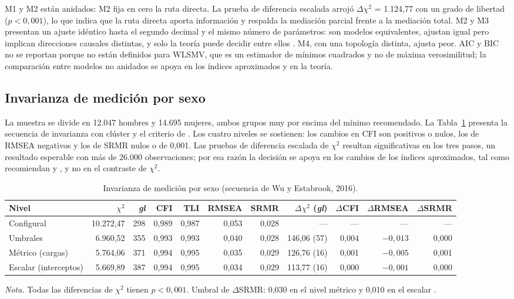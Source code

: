 \documentclass[11pt,a4paper]{article}
\newcommand{\chisq}{$\chi^2$}
\newcommand{\df}{\textit{gl}}
\begin{document}
M1 y M2 están anidados: M2 fija en cero la ruta directa. La prueba de diferencia escalada
arrojó $\Delta\chi^2$ = 1.124,77 con un grado de libertad ($p < 0,001$), lo que indica que la
ruta directa aporta información y respalda la mediación parcial frente a la mediación total.
M2 y M3 presentan un ajuste idéntico hasta el segundo decimal y el mismo número de
parámetros: son modelos equivalentes, ajustan igual pero implican direcciones causales
distintas, y solo la teoría puede decidir entre ellos \citep{maccallum1993}. M4, con una
topología distinta, ajusta peor. AIC y BIC no se reportan porque no están definidos para
WLSMV, que es un estimador de mínimos cuadrados y no de máxima verosimilitud; la comparación
entre modelos no anidados se apoya en los índices aproximados y en la teoría.

\subsection{Invarianza de medición por sexo}

La muestra se divide en 12.047 hombres y 14.695 mujeres, ambos grupos muy por encima del
mínimo recomendado. La Tabla~\ref{tab:invsexo} presenta la secuencia de invarianza con
clúster y el criterio de \citet{chen2007}. Los cuatro niveles se sostienen: los cambios en
CFI son positivos o nulos, los de RMSEA negativos y los de SRMR nulos o de 0,001. Las
pruebas de diferencia escalada de \chisq{} resultan significativas en los tres pasos, un
resultado esperable con más de 26.000 observaciones; por esa razón la decisión se apoya en
los cambios de los índices aproximados, tal como recomiendan \citet{cheung2002} y
\citet{chen2007}, y no en el contraste de \chisq{}.

\begin{table}[htbp]
\centering
\caption{Invarianza de medición por sexo (secuencia de Wu y Estabrook, 2016).}
\label{tab:invsexo}
\footnotesize
\setlength{\tabcolsep}{4pt}
\begin{tabular}{@{}lrrrrrrrrrr@{}}
\toprule
Nivel & \chisq & \df & CFI & TLI & RMSEA & SRMR & $\Delta\chi^2$ (\df) & $\Delta$CFI & $\Delta$RMSEA & $\Delta$SRMR \\
\midrule
Configural & 10.272,47 & 298 & 0,989 & 0,987 & 0,053 & 0,028 & --- & --- & --- & --- \\
Umbrales & 6.960,52 & 355 & 0,993 & 0,993 & 0,040 & 0,028 & 146,06 (57) & 0,004 & $-0,013$ & 0,000 \\
Métrico (cargas) & 5.764,06 & 371 & 0,994 & 0,995 & 0,035 & 0,029 & 126,76 (16) & 0,001 & $-0,005$ & 0,001 \\
Escalar (interceptos) & 5.669,89 & 387 & 0,994 & 0,995 & 0,034 & 0,029 & 113,77 (16) & 0,000 & $-0,001$ & 0,000 \\
\bottomrule
\end{tabular}

\vspace{2pt}
\parbox{0.95\textwidth}{\footnotesize \textit{Nota.} Todas las diferencias de $\chi^2$
tienen $p < 0,001$. Umbral de $\Delta$SRMR: 0,030 en el nivel métrico y 0,010 en el escalar
\citep{chen2007}.}
\end{table}
\end{document}
